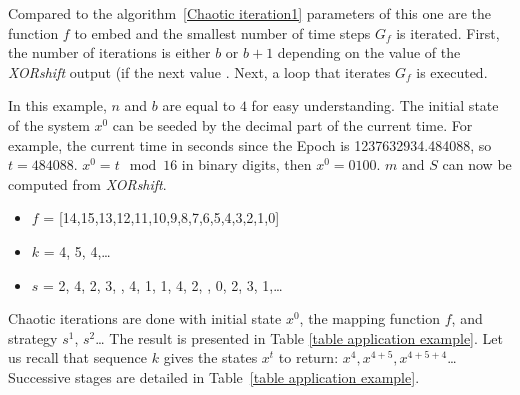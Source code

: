 Compared to the algorithm~\ref{Chaotic iteration1}
parameters of this one are 
the function $f$ to embed and 
the smallest number of time steps $G_f$ is iterated. 
First, the number of iterations is either $b$ or $b+1$ depending on the 
value of the \textit{XORshift} output (if the next value .
Next, a loop that iterates $G_f$ is executed.

In this example, $n$ and $b$ are equal to $4$ for easy understanding.
The initial state of the system $x^0$ can be seeded by the decimal part of the current time.
For example, the current time in seconds since the Epoch is 1237632934.484088,
so $t = 484088$. $x^0 = t \mod 16 $ in binary digits, then $x^0 = 0100$.
$m$ and $S$ can now be computed from \textit{XORshift}.
\begin{itemize}
\item $f$ = [14,15,13,12,11,10,9,8,7,6,5,4,3,2,1,0] 
\item $k$ = 4, 5, 4,\ldots
\item $s$ = 2,  4,  2,  3, ,  4,  1,  1,  4,  2, ,  0,  2,  3,  1,\ldots
\end{itemize}
Chaotic iterations are done with initial state $x^0$,
the mapping function $f$, and strategy $s^1$, $s^2$\ldots
The result is presented in Table \ref{table application example}. 
Let us recall that sequence $k$ gives the states $x^t$ to return: $x^4, x^{4+5}, x^{4+5+4}$\ldots
Successive stages are detailed in Table~\ref{table application example}.

